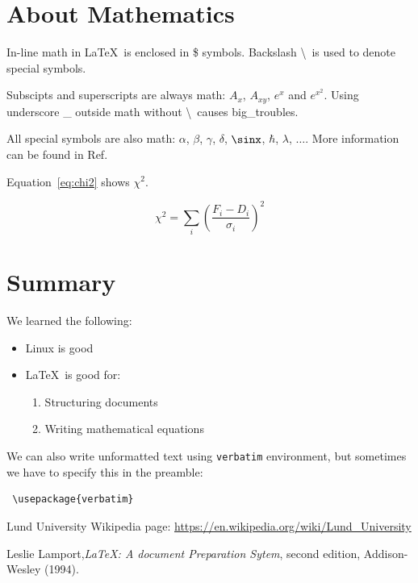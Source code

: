 \documentclass[a4paper,12pt,twoside]{article}
\begin{document}
\section{About Mathematics}
\label{sec:math}

In-line math in \LaTeX \ is enclosed in \$ symbols. Backslash \textbackslash \ is used to denote special symbols.

Subscipts and superscripts are always math: $A_x$, $A_{xy}$, $e^x$ and $e^{x^2}$. Using underscore \_ outside math without \textbackslash \ causes big\_troubles.

All special symbols are also math: $\alpha$, $\beta$, $\gamma$, $\delta$, $\sinx$, $\hbar$, $\lambda$, $\ldots$. More information can be found in Ref.~\cite{latex}

Equation~\ref{eq:chi2} shows $\chi^2$.

\begin{equation}
\label{eq:chi2}
  \chi^2 = \sum\limits_i \left(\frac{F_i - D_i}{\sigma_i}\right)^2
\end{equation}

 
 \section{Summary}
 
 We learned the following: 
\begin{itemize}
 \item Linux is good
 \item \LaTeX \ is good for:
  \begin{enumerate}
   \item Structuring documents
   \item Writing mathematical equations
  \end{enumerate}

\end{itemize}


We can also write unformatted text using \texttt{verbatim} environment, but sometimes we have to specify this in the preamble:
\begin{verbatim}
 \usepackage{verbatim}
\end{verbatim}





 
 \begin{thebibliography}{99}
   Lund University Wikipedia page: \url{https://en.wikipedia.org/wiki/Lund_University}

   Leslie Lamport,\textit{LaTeX: A document Preparation Sytem}, second edition, Addison-Wesley (1994).
 \end{thebibliography}

 
 \label{sec:sum}

 
 
 
\end{document}
